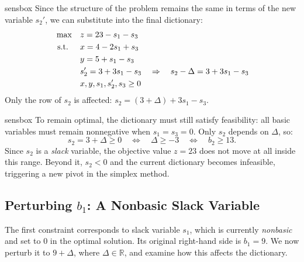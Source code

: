 \begin{steppanel}{sensbox}
Since the structure of the problem remains the same in terms of the new variable \( s_2' \), we can substitute into the final dictionary:
\[
\begin{aligned}
\max \quad
& z = 23 - s_1 - s_3 \\
\text{ s.t. } \quad
& x = 4 - 2s_1 + s_3 \\
& y = 5 + s_1 - s_3 \\
& s_2'  = 3 + 3s_1 - s_3
\quad \Rightarrow \quad
s_2 - \Delta = 3  + 3s_1 - s_3 \\
& x, y, s_1, s_2', s_3 \geq 0
\end{aligned}
\]
Only the row of \( s_2 \) is affected: \( s_2 = (3 + \Delta) + 3s_1 - s_3 \).
\end{steppanel}

\begin{steppanel}{sensbox}
To remain optimal, the dictionary must still satisfy feasibility: all basic variables must remain nonnegative when \( s_1 = s_3 = 0 \). Only \( s_2 \) depends on \( \Delta \), so:
\[
s_2 = 3 + \Delta \geq 0
\quad\Longleftrightarrow\quad
\boxed{\Delta \geq -3}
\quad\Longleftrightarrow\quad
b_2 \geq 13.
\]
Since \( s_2 \) is a \emph{slack} variable, the objective value \( z = 23 \) does not move at all inside this range. Beyond it, \( s_2 < 0 \) and the current dictionary becomes infeasible, triggering a new pivot in the simplex method.
\end{steppanel}

\subsection{Perturbing \( b_1 \): A Nonbasic Slack Variable}

The first constraint corresponds to slack variable \( s_1 \), which is currently \emph{nonbasic} and set to 0 in the optimal solution. Its original right-hand side is \( b_1 = 9 \). We now perturb it to \( 9 + \Delta \), where \( \Delta \in \mathbb{R} \), and examine how this affects the dictionary.

